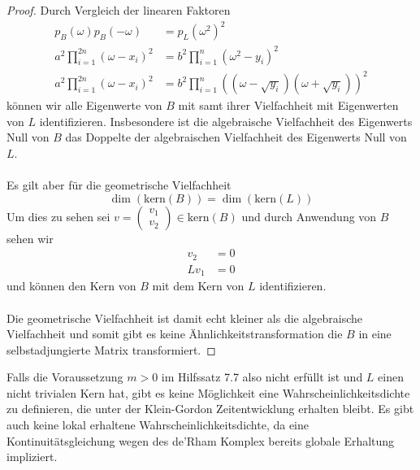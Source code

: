 \documentclass[11pt,a4paper,leqno]{report}
\numberwithin{equation}{chapter}
\begin{document}
\begin{proof}
Durch Vergleich der linearen Faktoren
\begin{align*}
	p_{B}(\omega)p_{B}(-\omega)&=p_{L}(\omega^2)^2\\
	a^2\prod_{i=1}^{2n}(\omega-x_i)^2 &= b^2\prod_{i=1}^n(\omega^2-y_i)^2\\
	a^2\prod_{i=1}^{2n}(\omega-x_i)^2 &= b^2\prod_{i=1}^n((\omega-\sqrt{y_i})(\omega+\sqrt{y_i}))^2
\end{align*}
k\"onnen wir alle Eigenwerte von $B$ mit samt ihrer Vielfachheit mit Eigenwerten von $L$ identifizieren. Insbesondere ist die algebraische Vielfachheit des Eigenwerts Null von $B$ das Doppelte der algebraischen Vielfachheit des Eigenwerts Null von $L$.\\
\\
Es gilt aber f\"ur die geometrische Vielfachheit
\begin{equation*}
	\dim(\text{kern}(B))=\dim(\text{kern}(L))
\end{equation*}
Um dies zu sehen sei $v=\begin{pmatrix}
	v_1  \\ v_2
\end{pmatrix}\in\text{kern}(B)$ und durch Anwendung von $B$ sehen wir
\begin{align*}
	v_2 &= 0\\
	Lv_1&= 0
\end{align*}
und k\"onnen den Kern von $B$ mit dem Kern von $L$ identifizieren.\\
\\
Die geometrische Vielfachheit ist damit echt kleiner als die algebraische Vielfachheit und somit gibt es keine \"Ahnlichkeitstransformation die $B$ in eine selbstadjungierte Matrix transformiert.
\end{proof}
\noindent
Falls die Voraussetzung $m>0$ im Hilfssatz 7.7 also nicht erf\"ullt ist und $L$ einen nicht trivialen Kern hat, gibt es keine M\"oglichkeit eine Wahrscheinlichkeitsdichte zu definieren, die unter der Klein-Gordon Zeitentwicklung erhalten bleibt. Es gibt auch keine lokal erhaltene Wahrscheinlichkeitsdichte, da eine Kontinuit\"atsgleichung wegen des de'Rham Komplex bereits globale Erhaltung impliziert.

\end{document}
